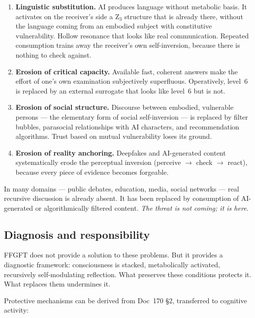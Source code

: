 \begin{enumerate}
\item \textbf{Linguistic substitution.} AI produces language without metabolic basis. It activates on the receiver's side a Z$_3$ structure that is already there, without the language coming from an embodied subject with constitutive vulnerability. Hollow resonance that looks like real communication. Repeated consumption trains away the receiver's own self-inversion, because there is nothing to check against.
\item \textbf{Erosion of critical capacity.} Available fast, coherent answers make the effort of one's own examination subjectively superfluous. Operatively, level~6 is replaced by an external surrogate that looks like level~6 but is not.
\item \textbf{Erosion of social structure.} Discourse between embodied, vulnerable persons --- the elementary form of social self-inversion --- is replaced by filter bubbles, parasocial relationships with AI characters, and recommendation algorithms. Trust based on mutual vulnerability loses its ground.
\item \textbf{Erosion of reality anchoring.} Deepfakes and AI-generated content systematically erode the perceptual inversion (perceive $\to$ check $\to$ react), because every piece of evidence becomes forgeable.
\end{enumerate}

\begin{important}
In many domains --- public debates, education, media, social networks --- real recursive discussion is already absent. It has been replaced by consumption of AI-generated or algorithmically filtered content. \emph{The threat is not coming; it is here.}
\end{important}

\subsection{Diagnosis and responsibility}\label{sec:consequences_diagnosis}

FFGFT does not provide a solution to these problems. But it provides a diagnostic framework: consciousness is stacked, metabolically activated, recursively self-modulating reflection. What preserves these conditions protects it. What replaces them undermines it.

Protective mechanisms can be derived from Doc~170 \S2, transferred to cognitive activity:

